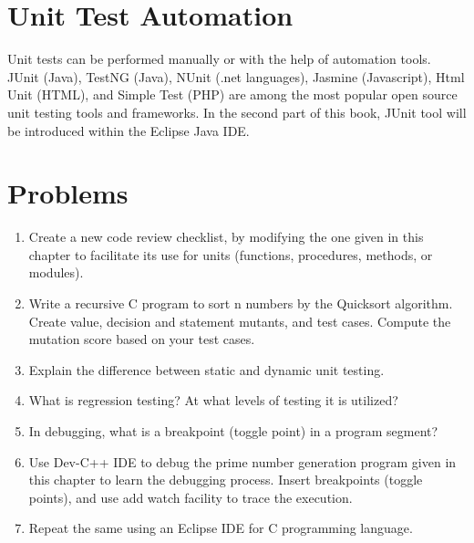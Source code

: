 \section{Unit Test Automation}
Unit tests can be performed manually or with the help of automation tools. JUnit (Java), TestNG (Java), NUnit (.net languages), Jasmine (Javascript), Html Unit (HTML), and Simple Test (PHP) are among the most popular open source unit testing tools and frameworks. In the second part of this book, JUnit tool will be introduced within the Eclipse Java IDE.  

\section{Problems}
\begin{enumerate}
    \item Create a new code review checklist, by modifying the one given in this chapter to facilitate its use for units (functions, procedures, methods, or modules). 
    \item Write a recursive C program to sort n numbers by the Quicksort algorithm. Create value, decision and statement mutants, and test cases. Compute the mutation score based on your test cases.  
    \item Explain the difference between static and dynamic unit testing.
    \item What is regression testing? At what levels of testing it is utilized?
    \item In debugging, what is a breakpoint (toggle point) in a program segment?
    \item Use Dev-C++ IDE to debug the prime number generation program given in this chapter to learn the debugging process. Insert breakpoints (toggle points), and use add watch facility to trace the execution.
    \item Repeat the same using an Eclipse IDE for C programming language.
\end{enumerate}